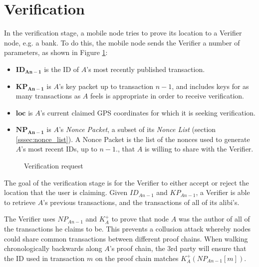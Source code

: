 \section{Verification} \label{ssec:verification}
\begin{minipage}{0.5\linewidth}
In the verification stage, a mobile node tries to prove its location to a Verifier node, e.g. a bank. To do this, the mobile node sends the Verifier a number of parameters, as shown in Figure \ref{fig:verify_request}:
\begin{itemize}[noitemsep,topsep=0pt]
	\item[] $\mathbf{ID_{An-1}}$ is the ID of $A$'s most recently published transaction.
	\item[] $\mathbf{KP_{An-1}}$ is $A$'s key packet up to transaction $n-1$, and includes keys for as many transactions as $A$ feels is appropriate in order to receive verification.
	\item[] $\mathbf{loc}$ is $A$'s current claimed GPS coordinates for which it is seeking verification.
	\item[] $\mathbf{NP_{An-1}}$ is $A$'s \textit{Nonce Packet}, a subset of its \textit{Nonce List} (section \ref{sssec:nonce_list}). A Nonce Packet is the list of the nonces used to generate $A$'s most recent IDs, up to $n-1$., that $A$ is willing to share with the Verifier. 
\end{itemize}
\end{minipage}
\hfill
\begin{minipage}[c]{0.5\linewidth}
\begin{figure}[H]

\caption{Verification request}
\label{fig:verify_request}
\end{figure}
\end{minipage}

The goal of the verification stage is for the Verifier to either accept or reject the location that the user is claiming. Given $ID_{An-1}$ and $KP_{An-1}$, a Verifier is able to retrieve $A$'s previous transactions, and the transactions of all of its alibi's.

The Verifier uses $NP_{An-1}$ and $K^{+}_A$ to prove that node $A$ was the author of all of the transactions he claims to be. This prevents a collusion attack whereby nodes could share common transactions between different proof chains. When walking chronologically backwards along $A$'s proof chain, the 3rd party will ensure that the ID used in transaction $m$ on the proof chain matches $K^{+}_A(NP_{An-1}[m])$.

